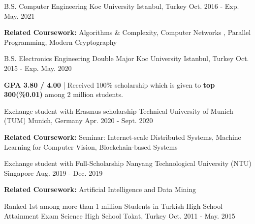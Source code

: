 \begin{cventries}

\cventry
    {B.S. Computer Engineering} %
    {Koc University } %
    {Istanbul, Turkey} %
    {Oct. 2016 - Exp. May. 2021} %
    {\begin{cvitems} %
        \item {\textbf{Related Coursework:} Algorithms \& Complexity, Computer Networks
, Parallel Programming, Modern Cryptography}
      \end{cvitems}
    }
\cventry
    {B.S. Electronics Engineering Double Major} %
    {Koc University } %
    {Istanbul, Turkey} %
    {Oct. 2015 - Exp. May. 2020} %
    {
      \begin{cvitems} %
        \item {\textbf{GPA 3.80 / 4.00} | Received 100\% scholarship which is given to \textbf{top 300(\%0.01)} among 2 million students.}
      \end{cvitems}
    }
\cventry
    {Exchange student with Erasmus scholarship }
    {Technical University of Munich (TUM)} %
    {Munich, Germany} %
    {Apr. 2020 - Sept. 2020} %
    {\begin{cvitems} %
        \item {\textbf{Related Coursework:} Seminar: Internet-scale Distributed Systems, Machine Learning for Computer Vision, Blockchain-based Systems}
      \end{cvitems}
    }
\cventry
    {Exchange student with Full-Scholarship}
    {Nanyang Technological University (NTU)} %
    {Singapore} %
    {Aug. 2019 - Dec. 2019} %
    {\begin{cvitems} %
        \item {\textbf{Related Coursework:} Artificial Intelligence and Data Mining}
      \end{cvitems}
    }
  \cventry
    {Ranked 1st among more than 1 million Students in Turkish High School Attainment Exam}
    {Science High School} %
    {Tokat, Turkey} %
    {Oct. 2011 - May. 2015} %
   {}
   
\end{cventries}
\vspace{-5mm}
